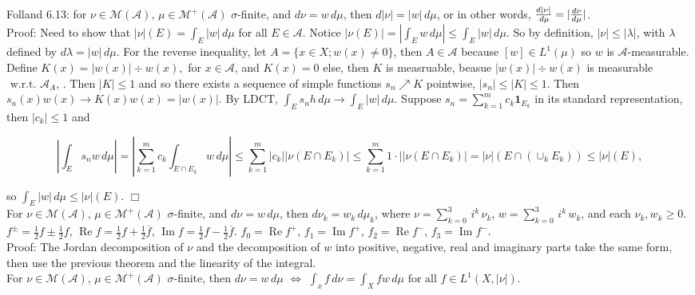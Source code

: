 \documentclass[12pt]{article}
\newcommand{\fall}[0] { \textrm{ for all } }
\newcommand{\wrt}[0] { \textrm{ w.r.t. } }
\newcommand{\lrimply}[0] { \Leftrightarrow }
\newcommand{\rarw}[0] { \rightarrow }
\newcommand{ \cf }[1] { \mathbf{1}_{#1} }
\renewcommand{\Re}{ \operatorname{Re} }
\renewcommand{\Im}{ \operatorname{Im} }
\newcommand{\A}[0] { \mathcal{A} }
\newcommand{\M}[0] { \mathcal{M} }
\begin{document}
Folland 6.13: for $\nu \in \M(\A)$, $\mu \in \M^+(\A)$ $\sigma$-finite, and $d\nu = w \, d\mu$, then $d|\nu| = |w| \, d\mu$, or in other words, $\frac{d|\nu|}{\\d\mu} = |\frac{d\nu}{d\mu}|$. \\

\noindent
Proof: Need to show that $|\nu|(E) = \int_E |w| \, d\mu$ for all $E \in \A$. Notice $|\nu(E)| = |\int_E w \, d\mu| \le \int_E |w| \, d\mu$. So by definition, $|\nu| \le |\lambda|$, with $\lambda$ defined by $d\lambda = |w| \, d\mu$. For the reverse inequality, let $A = \{x \in X; w(x) \not = 0 \}$, then $A \in \A$ because $[w] \in L^1(\mu)$ so $w$ is $\A$-measurable. Define $K(x) = |w(x)| \div w(x),$ for $x \in \A$, and $K(x) = 0$ else, then $K$ is measruable, beasue $ |w(x)| \div w(x) $ is measurable $\wrt \A_A$, . Then $|K| \le 1$ and so there exists a sequence of simple functions $s_n \nearrow K$ pointwise, $|s_n| \le |K| \le 1$. Then $s_n(x) w(x) \rarw K(x) w(x) = |w(x)|$. By LDCT, $\int_E s_n h \, d\mu \rarw \int_E |w| \, d\mu$. Suppose $s_n = \sum_{k=1}^m c_k \cf{E_k}$ in its standard representation, then $|c_k| \le 1$ and 

$$
|\int_E s_n w \, d\mu | = |\sum_{k=1}^m c_k \int_{E \cap E_k} w \, d\mu| \le \sum_{k=1}^m |c_k| |\nu(E \cap E_k)|  \le \sum_{k=1}^m 1 \cdot| |\nu(E \cap E_k)| = |\nu|(E \cap (\cup_k E_k)) \le |\nu|(E),
$$

\noindent
so $\int_E |w| \, d\mu \le |\nu|(E)$. $\Box$\\

For $\nu \in \M(\A)$, $\mu \in \M^+(\A)$ $\sigma$-finite, and $d\nu = w \, d\mu$, then $d\nu_k = w_k \, d\mu_k$, where $\nu = \sum_{k=0}^3 \, i^k \, \nu_k$, $w = \sum_{k=0}^3 \, i^k \, w_k$, and each $\nu_k , w_k \ge 0$. \\

\noindent
$f^\pm = \frac{1}{2} f \pm  \frac{1}{2} f$, $\Re{f} = \frac{1}{2} f + \frac{1}{2} \overline{f}$, $\Im{f} = \frac{1}{2} f - \frac{1}{2} \overline{f}$. $f_0 = \Re{f}^+$, $f_1 = \Im{f}^+$, $f_2 = \Re{f}^-$, $f_3 = \Im{f}^-$. \\

\noindent
Proof: The Jordan decomposition of $\nu$ and the decomposition of $w$ into positive, negative, real and imaginary parts take the same form, then use the  previous theorem and the linearity of the integral. \\

For $\nu \in \M(\A)$, $\mu \in \M^+(\A)$ $\sigma$-finite, then $d\nu = w \, d\mu$ $\lrimply$ $\int_x f \, d\nu = \int_X fw \, d\mu \fall f \in L^1(X, |\nu|)$.\\
\end{document}

